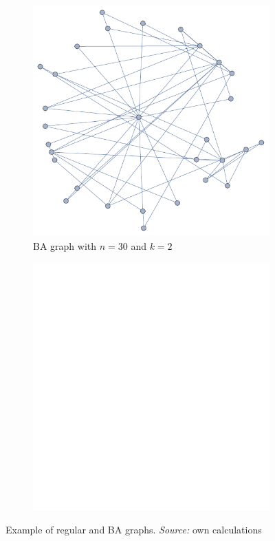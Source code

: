 \documentclass[english, twoside, 12pt, a4paper]{article}
\theoremstyle{definition}
\theoremstyle{plain}
\theoremstyle{remark}
\begin{document}
\begin{figure}[hbt]
    \begin{subfigure}[t]{0.40\textwidth}
    \includegraphics[width=\textwidth]{../ramsza/figs/graph_ba_a.pdf}
    \caption{BA graph with \( n = 30 \) and \( k = 2\)}
    \label{fig:graphsc}
  \end{subfigure}
  \hfill
  \begin{subfigure}[t]{0.40\textwidth}
    \includegraphics[width=\textwidth]{../ramsza/figs/empty.pdf}
  \end{subfigure}
  
  \captionsetup{margin=10pt,font=small,labelfont=bf,width=.8\textwidth}

  \caption[Exampls of graphs]{Example of regular and BA graphs. \textit{Source:} own calculations}\label{fig:graphs}
\end{figure}
\end{document}
